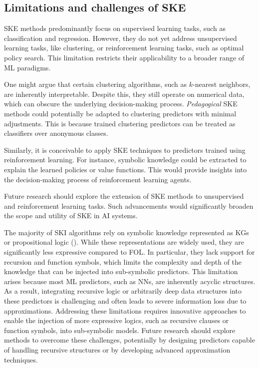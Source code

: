 \subsection[Limitations and challenges of SKE]{Limitations and challenges of \Gls{SKE}}\label{subsec:limitations-and-challenges-of-ske}
%
\Gls{SKE} methods predominantly focus on supervised learning tasks, such as classification and regression.
%
However, they do not yet address unsupervised learning tasks, like clustering, or reinforcement learning tasks, such as optimal policy search.
%
This limitation restricts their applicability to a broader range of \gls{ML} paradigms.

%
One might argue that certain clustering algorithms, such as \(k\)-nearest neighbors, are inherently interpretable.
%
Despite this, they still operate on numerical data, which can obscure the underlying decision-making process.
%
\emph{Pedagogical} \gls{SKE} methods could potentially be adapted to clustering predictors with minimal adjustments.
%
This is because trained clustering predictors can be treated as classifiers over anonymous classes.

%
Similarly, it is conceivable to apply \gls{SKE} techniques to predictors trained using reinforcement learning.
%
For instance, symbolic knowledge could be extracted to explain the learned policies or value functions.
%
This would provide insights into the decision-making process of reinforcement learning agents.

%
Future research should explore the extension of \gls{SKE} methods to unsupervised and reinforcement learning tasks.
%
Such advancements would significantly broaden the scope and utility of \gls{SKE} in \gls{AI} systems.
%

The majority of \gls{SKI} algorithms rely on symbolic knowledge represented as \glspl{KG} or propositional logic ().
%
While these representations are widely used, they are significantly less expressive compared to \gls{FOL}.
%
In particular, they lack support for recursion and function symbols, which limits the complexity and depth of the knowledge that can be injected into sub-symbolic predictors.
%
This limitation arises because most \gls{ML} predictors, such as \glspl{NN}, are inherently acyclic structures.
%
As a result, integrating recursive logic or arbitrarily deep data structures into these predictors is challenging and often leads to severe information loss due to approximations.
%
Addressing these limitations requires innovative approaches to enable the injection of more expressive logics, such as recursive clauses or function symbols, into sub-symbolic models.
%
Future research should explore methods to overcome these challenges, potentially by designing predictors capable of handling recursive structures or by developing advanced approximation techniques.
%